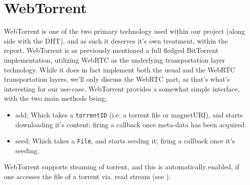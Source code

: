 \section{WebTorrent}
\label{sec:WebTorrent}
WebTorrent is one of the two primary technology used within our project (along 
side with the \acs{DHT}), and as such it deserves it's own treatment, within the 
report.
\newline\newline
WebTorrent is as previously mentioned a full fledged BitTorrent implementation, 
utilizing WebRTC as the underlying transportation layer technology. While it 
does in fact implement both the usual and the WebRTC transportation layers,
we'll only discuss the WebRTC part, as that's what's interesting for our
use-case.
\newline
WebTorrent provides a somewhat simple interface, with the two main methods being;
\begin{itemize}
    \item add; Which takes a \verb|torrentID| (i.e. a torrent file or magnetURI),
        and starts downloading it's content; firing a callback once meta-data has
        been acquired.
    \item seed; Which takes a \verb|File|, and starts seeding it; firing a
        callback once it's seeding.
\end{itemize}
WebTorrent supports steaming of torrent, and this is automatically enabled, if 
one accesses the file of a torrent via. read stream (see \citep{WebTorrent:api}).
